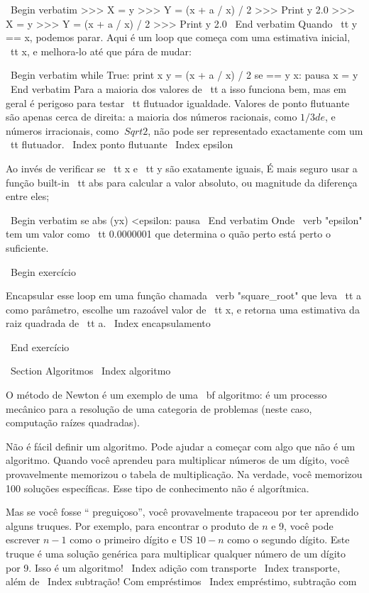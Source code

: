 \documentclass[10pt]{book}
\begin{document}
{{{{\ Begin {verbatim}
>>> X = y
>>> Y = (x + a / x) / 2
>>> Print y
2.0
>>> X = y
>>> Y = (x + a / x) / 2
>>> Print y
2.0
\ End {verbatim}
%
Quando {\ tt y == x}, podemos parar. Aqui é um loop que começa
com uma estimativa inicial, {\ tt x}, e melhora-lo até que
pára de mudar:

\ Begin {verbatim}
while True:
    print x
    y = (x + a / x) / 2
    se == y x:
        pausa
    x = y
\ End {verbatim}
%
Para a maioria dos valores de {\ tt a} isso funciona bem, mas em geral é
perigoso para testar {\ tt flutuador} igualdade.
Valores de ponto flutuante são apenas cerca de direita:
a maioria dos números racionais, como $ 1/3 de $, e números irracionais, como
$ \ Sqrt {2} $, não pode ser representado exactamente com um {\ tt flutuador}.
\ Index {ponto flutuante}
\ Index {epsilon}

Ao invés de verificar se {\ tt x} e {\ tt y} são exatamente iguais,
É mais seguro usar a função built-in {\ tt abs} para calcular a
valor absoluto, ou magnitude da diferença entre eles;

\ Begin {verbatim}
    se abs (yx) <epsilon:
        pausa
\ End {verbatim}
%
Onde \ verb "epsilon" tem um valor como {\ tt 0.0000001} que
determina o quão perto está perto o suficiente.

\ Begin {} exercício

Encapsular esse loop em uma função chamada \ verb "square_root"
que leva {\ tt a} como parâmetro, escolhe um razoável
valor de {\ tt x}, e retorna uma estimativa da raiz quadrada
de {\ tt a}.
\ Index {} encapsulamento

\ End {} exercício


\ Section {} Algoritmos
\ Index {algoritmo}

O método de Newton é um exemplo de uma {\ bf algoritmo}: é um
processo mecânico para a resolução de uma categoria de problemas (neste
caso, computação raízes quadradas).

Não é fácil definir um algoritmo. Pode ajudar a começar
com algo que não é um algoritmo. Quando você aprendeu
para multiplicar números de um dígito, você provavelmente memorizou o
tabela de multiplicação. Na verdade, você memorizou 100 soluções específicas.
Esse tipo de conhecimento não é algorítmica.

Mas se você fosse `` preguiçoso'', você provavelmente trapaceou por ter aprendido alguns
truques. Por exemplo, para encontrar o produto de $ n $ e 9, você pode
escrever $ n-1 $ como o primeiro dígito e US $ 10-n $ como o segundo
dígito. Este truque é uma solução genérica para multiplicar qualquer
número de um dígito por 9. Isso é um algoritmo!
\ Index {adição com transporte}
\ Index {transporte, além de}
\ Index {subtração! Com empréstimos}
\ Index {empréstimo, subtração com}

}}}}
\end{document}
